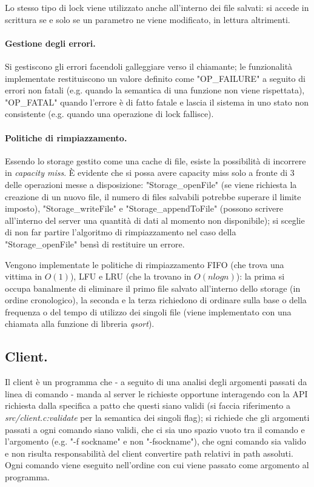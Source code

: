\documentclass[11pt, italian, openany]{book}
\begin{document}
\begin{sloppypar}
Lo stesso tipo di lock viene utilizzato anche all'interno dei file salvati: si accede in scrittura se e solo se un parametro
ne viene modificato, in lettura altrimenti.

\paragraph*{Gestione degli errori.}
Si gestiscono gli errori facendoli galleggiare verso il chiamante; le funzionalit\`a implementate restituiscono un valore definito
come "OP\_FAILURE" a seguito di errori non fatali (e.g. quando la semantica di una funzione non viene rispettata), "OP\_FATAL"
quando l'errore \`e di fatto fatale e lascia il sistema in uno stato non consistente (e.g. quando una operazione di lock fallisce).

\paragraph*{Politiche di rimpiazzamento.}
Essendo lo storage gestito come una cache di file, esiste la possibilit\`a di incorrere in \textit{capacity miss}.
\`E evidente che si possa avere capacity miss solo a fronte di 3 delle operazioni messe a disposizione:
"Storage\_openFile" (se viene richiesta la creazione di un nuovo file, il numero di files salvabili potrebbe superare il limite
imposto), "Storage\_writeFile" e "Storage\_appendToFile" (possono scrivere all'interno del server una quantit\`a di dati
al momento non disponibile); si sceglie di non far partire l'algoritmo di rimpiazzamento nel caso della "Storage\_openFile"
bens\`i di restituire un errore.

Vengono implementate le politiche di rimpiazzamento FIFO (che trova una vittima in \(O(1)\)), LFU e LRU (che la trovano in
\(O(nlogn)\)): la prima si occupa banalmente di eliminare il primo file salvato all'interno dello storage (in ordine cronologico),
la seconda e la terza richiedono di ordinare sulla base o della frequenza o del tempo di utilizzo dei singoli file (viene
implementato con una chiamata alla funzione di libreria \textit{qsort}).

\subsection{Client.}
Il client \`e un programma che - a seguito di una analisi degli argomenti passati da linea di comando - manda al server le
richieste opportune interagendo con la API richiesta dalla specifica a patto che questi siano validi (si faccia riferimento a 
\textit{src/client.c:validate} per la semantica dei singoli flag); si richiede che gli argomenti passati a ogni comando siano
validi, che ci sia uno spazio vuoto tra il comando e l'argomento (e.g. "-f sockname" e non "-fsockname"), che ogni comando sia
valido e non risulta responsabilit\`a del client convertire path relativi in path assoluti. Ogni comando viene eseguito nell'ordine
con cui viene passato come argomento al programma.


\end{sloppypar}
\end{document}
